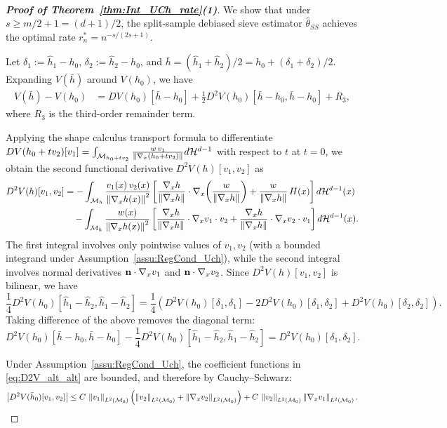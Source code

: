 \documentclass[12pt,american]{article}
\theoremstyle{definition}
\theoremstyle{plain}
\theoremstyle{definition}
\theoremstyle{plain}
\theoremstyle{plain}
\theoremstyle{plain}
\theoremstyle{plain}
\theoremstyle{plain}
\newcommand{\norm}[1]{\left\| #1 \right\|}
\begin{document}
~

\begin{proof}[\textbf{Proof of Theorem~\ref{thm:Int_UCh_rate}(1)}]
We show that under $s \ge m/2 + 1 = (d+1)/2$, the split-sample debiased sieve estimator $\hat{\theta}_{SS}$ achieves the optimal rate $r_n^* = n^{-s/(2s+1)}$.

Let $\delta_1 := \hat{h}_1 - h_0$, $\delta_2 := \hat{h}_2 - h_0$, and $\bar{h} = (\hat{h}_1 + \hat{h}_2)/2 = h_0 + (\delta_1 + \delta_2)/2$. Expanding $V(\bar{h})$ around $V(h_0)$, we have
\begin{align}
V(\bar{h}) - V(h_0) &= DV(h_0)[\bar{h} - h_0] + \frac{1}{2}D^2V(h_0)[\bar{h} - h_0, \bar{h} - h_0] + R_3, \label{eq:V_taylor}
\end{align}
where $R_3$ is the third-order remainder term.

Applying the shape calculus transport formula to differentiate $DV(h_0+tv_2)[v_1]=\int_{{\cal M}_{h_0+tv_2}}\frac{w\,v_1}{\norm{\Dif_{x}(h_0+tv_2)}}d{\cal H}^{d-1}$ with respect to $t$ at $t=0$, we obtain the second functional derivative $D^2V(h)[v_1,v_2]$ as
\begin{align}\label{eq:D2V_alt_alt}
D^2V(h)[v_1,v_2]&=-\int_{{\cal M}_h}
\frac{v_1(x)\,v_2(x)}{\norm{\Dif_{x}h(x)}^2}
\left[\frac{\Dif_{x}h}{\norm{\Dif_{x}h}}\cd\Dif_{x}\!\left(\frac{w}{\norm{\Dif_{x}h}}\right)
+\frac{w}{\norm{\Dif_{x}h}}\,H(x)\right]d{\cal H}^{d-1}(x) \notag\\
&\quad - \int_{{\cal M}_h} \frac{w(x)}{\norm{\Dif_{x}h(x)}^2} \left[\frac{\Dif_{x}h}{\norm{\Dif_{x}h}} \cd \Dif_{x} v_1 \cd v_2 + \frac{\Dif_{x}h}{\norm{\Dif_{x}h}} \cd \Dif_{x} v_2 \cd v_1\right] d{\cal H}^{d-1}(x).
\end{align}
The first integral involves only pointwise values of $v_1,v_2$ (with a bounded integrand under Assumption~\ref{assu:RegCond_Uch}), while the second integral involves normal derivatives ${\bf n}\cdot\nabla_x v_1$ and ${\bf n}\cdot\nabla_x v_2$. Since $D^2V(h)[v_1, v_2]$ is bilinear, we have
\[
\frac{1}{4}D^2V(h_0)[\hat{h}_1 - \hat{h}_2, \hat{h}_1 - \hat{h}_2] = \frac{1}{4}\left(D^2V(h_0)[\delta_1, \delta_1] - 2D^2V(h_0)[\delta_1, \delta_2] + D^2V(h_0)[\delta_2, \delta_2]\right).
\]
Taking difference of the above removes the diagonal term:
\[
D^2V(h_0)[\bar{h} - h_0, \bar{h} - h_0] - \frac{1}{4}D^2V(h_0)[\hat{h}_1 - \hat{h}_2, \hat{h}_1 - \hat{h}_2] = D^2V(h_0)[\delta_1, \delta_2].
\]

Under Assumption~\ref{assu:RegCond_Uch}, the coefficient functions in \eqref{eq:D2V_alt_alt} are bounded,
and therefore by Cauchy--Schwarz:
\begin{equation}\label{eq:D2V_alt_alt_bound_alt}
\big|D^2V(\bar h_0)[v_1,v_2]\big|
\leq C\,\norm{v_1}_{L^2({\cal M}_0)}\left(\norm{v_2}_{L^2({\cal M}_0)}+\norm{\Dif_x v_2}_{L^2({\cal M}_0)}\right)
+C\,\norm{v_2}_{L^2({\cal M}_0)}\norm{\Dif_x v_1}_{L^2({\cal M}_0)}.
\end{equation}


\end{proof}
\end{document}

